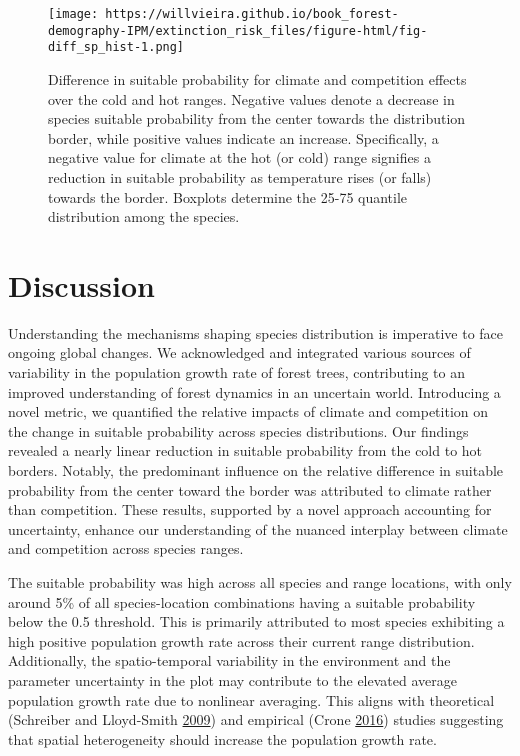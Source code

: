 \documentclass[12pt]{article}
\begin{document}
\begin{figure}
\hypertarget{fig:diff_sp_hist}{%
\centering
\texttt{[image: https://willvieira.github.io/book\_forest-demography-IPM/extinction\_risk\_files/figure-html/fig-diff\_sp\_hist-1.png]}
\caption{Difference in suitable probability for climate and competition
effects over the cold and hot ranges. Negative values denote a decrease
in species suitable probability from the center towards the distribution
border, while positive values indicate an increase. Specifically, a
negative value for climate at the hot (or cold) range signifies a
reduction in suitable probability as temperature rises (or falls)
towards the border. Boxplots determine the 25-75 quantile distribution
among the species.}\label{fig:diff_sp_hist}
}
\end{figure}

\hypertarget{discussion}{%
\section{Discussion}\label{discussion}}

Understanding the mechanisms shaping species distribution is imperative
to face ongoing global changes. We acknowledged and integrated various
sources of variability in the population growth rate of forest trees,
contributing to an improved understanding of forest dynamics in an
uncertain world. Introducing a novel metric, we quantified the relative
impacts of climate and competition on the change in suitable probability
across species distributions. Our findings revealed a nearly linear
reduction in suitable probability from the cold to hot borders. Notably,
the predominant influence on the relative difference in suitable
probability from the center toward the border was attributed to climate
rather than competition. These results, supported by a novel approach
accounting for uncertainty, enhance our understanding of the nuanced
interplay between climate and competition across species ranges.

The suitable probability was high across all species and range
locations, with only around 5\% of all species-location combinations
having a suitable probability below the 0.5 threshold. This is primarily
attributed to most species exhibiting a high positive population growth
rate across their current range distribution. Additionally, the
spatio-temporal variability in the environment and the parameter
uncertainty in the plot may contribute to the elevated average
population growth rate due to nonlinear averaging. This aligns with
theoretical (Schreiber and Lloyd-Smith
\protect\hyperlink{ref-Schreiber2009}{2009}) and empirical (Crone
\protect\hyperlink{ref-Crone2016}{2016}) studies suggesting that spatial
heterogeneity should increase the population growth rate.
\end{document}
